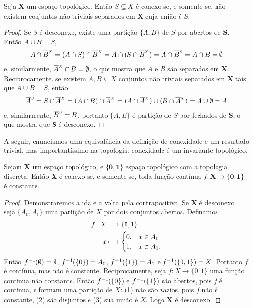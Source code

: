 \begin{proposition}
Seja $\bm X$ um espaço topológico. Então $S \subseteq X$ é conexo se, e somente se, não existem conjuntos não triviais separados em $\bm X$ cuja união é $S$.
\end{proposition}
\begin{proof}
Se $S$ é desconexo, existe uma partição $\{A,B\}$ de $S$ por abertos de $\bm S$. Então $A \cup B=S$,
	\begin{equation*}
	A \cap \overline{B}^{_X} = (A \cap S) \cap \overline{B}^{_X} = A \cap (S \cap \overline{B}^{_X}) = A \cap \overline{B}^{_S} = A \cap B = \emptyset
	\end{equation*}
e, similarmente, $\overline{A}^{_X} \cap B = \emptyset$, o que mostra que $A$ e $B$ são separados em $\bm X$. Reciprocamente, se existem $A,B \subseteq X$ conjuntos não triviais separados em $\bm X$ tais que $A \cup B=S$, então
	\begin{equation*}
	\overline{A}^{_S} = S \cap \overline{A}^{_X} = (A \cap B) \cap \overline{A}^{_X} = (A \cap \overline{A}^{_X}) \cup (B \cap \overline{A}^{_X}) = A \cup \emptyset = A
	\end{equation*}
e, similarmente, $\overline{B}^{_S}=B$, portanto $\{A,B\}$ é partição de $S$ por fechados de $\bm S$, o que mostra que $\bm S$ é desconexo.
\end{proof}

A seguir, enunciamos uma equivalência da definição de conexidade e um resultado trivial, mas importantíssimo na topologia: conexidade é um invariante topológico.

\begin{proposition}
Sejam $\bm X$ um espaço topológico, e $\bm {\{0,1\}}$ espaço topológico com a topologia discreta. Então $\bm X$ é conexo se, e somente se, toda função contínua $f: \bm X \to \bm{\{0,1\}}$ é constante.
\end{proposition}
\begin{proof}
Demonstraremos a ida e a volta pela contrapositiva. Se $\bm X$ é desconexo, seja $\{A_0,A_1\}$ uma partição de $X$ por dois conjuntos abertos. Definamos
	\begin{align*}
	{f}\colon {X} &\longrightarrow {\{0,1\}} \\{x} &\longmapsto 
	\begin{cases}
		0,& x \in A_0 \\
		1,& x \in A_1.
	\end{cases}
	\end{align*}
Então $f^{-1}(\emptyset)=\emptyset$, $f^{-1}(\{0\}) = A_0$, $f^{-1}(\{1\})=A_1$ e $f^{-1}(\{0,1\})=X$. Portanto $f$ é contínua, mas não é constante. Reciprocamente, seja $f: X \to \{0,1\}$ uma função contínua não constante. Então $f^{-1}(\{0\})$ e $f^{-1}(\{1\})$ são abertos, pois $f$ é contínua, e formam uma partição de $X$: (1) não são vazios, pois $f$ não é constante, (2) são disjuntos e (3) sua união é $X$. Logo $\bm X$ é desconexo.
\end{proof}

